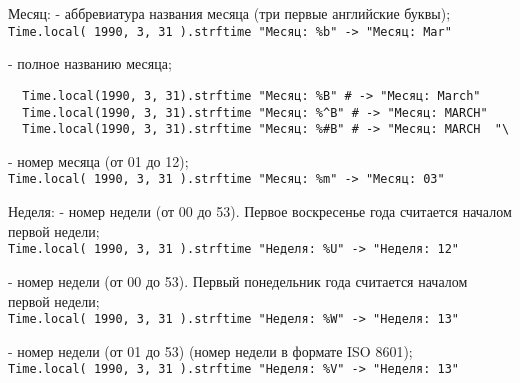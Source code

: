 \begin{keylist}{Месяц:}
   - аббревиатура названия месяца (три первые английские буквы);   
  \\\verb!Time.local( 1990, 3, 31 ).strftime "Месяц: %b" -> "Месяц: Mar"!    
  
   - полное названию месяца;
  \begin{verbatim}
  Time.local(1990, 3, 31).strftime "Месяц: %B" # -> "Месяц: March"
  Time.local(1990, 3, 31).strftime "Месяц: %^B" # -> "Месяц: MARCH"
  Time.local(1990, 3, 31).strftime "Месяц: %#B" # -> "Месяц: MARCH  "\
  \end{verbatim}    
   
   - номер месяца (от 01 до 12);  
  \\\verb!Time.local( 1990, 3, 31 ).strftime "Месяц: %m" -> "Месяц: 03"!
\end{keylist}

\begin{keylist}{Неделя:}
   - номер недели (от 00 до 53). Первое воскресенье года считается началом первой недели;  
  \\\verb!Time.local( 1990, 3, 31 ).strftime "Неделя: %U" -> "Неделя: 12"! 
   
   - номер недели (от 00 до 53). Первый понедельник года считается началом первой недели;  
  \\\verb!Time.local( 1990, 3, 31 ).strftime "Неделя: %W" -> "Неделя: 13"! 
   
   - номер недели (от 01 до 53) (номер недели в формате ISO 8601);  
  \\\verb!Time.local( 1990, 3, 31 ).strftime "Неделя: %V" -> "Неделя: 13"! 
\end{keylist}

